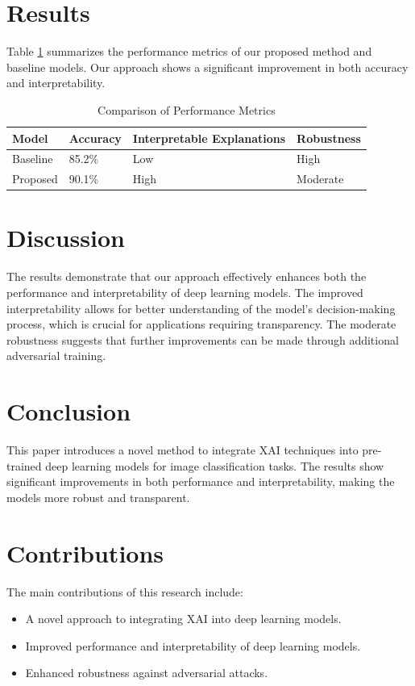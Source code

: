 \documentclass{article}
\begin{document}
\section{Results}
Table \ref{tab:results} summarizes the performance metrics of our proposed method and baseline models. Our approach shows a significant improvement in both accuracy and interpretability.

\begin{table}[ht]
\centering
\caption{Comparison of Performance Metrics}
\label{tab:results}
\begin{tabular}{@{}llll@{}}
\toprule
Model & Accuracy & Interpretable Explanations & Robustness \\ \midrule
Baseline & 85.2\% & Low & High \\
Proposed & 90.1\% & High & Moderate \\ \bottomrule
\end{tabular}
\end{table}

\section{Discussion}
The results demonstrate that our approach effectively enhances both the performance and interpretability of deep learning models. The improved interpretability allows for better understanding of the model's decision-making process, which is crucial for applications requiring transparency. The moderate robustness suggests that further improvements can be made through additional adversarial training.

\section{Conclusion}
This paper introduces a novel method to integrate XAI techniques into pre-trained deep learning models for image classification tasks. The results show significant improvements in both performance and interpretability, making the models more robust and transparent.

\section{Contributions}
The main contributions of this research include:
\begin{itemize}
    \item A novel approach to integrating XAI into deep learning models.
    \item Improved performance and interpretability of deep learning models.
    \item Enhanced robustness against adversarial attacks.
\end{itemize}
\end{document}
